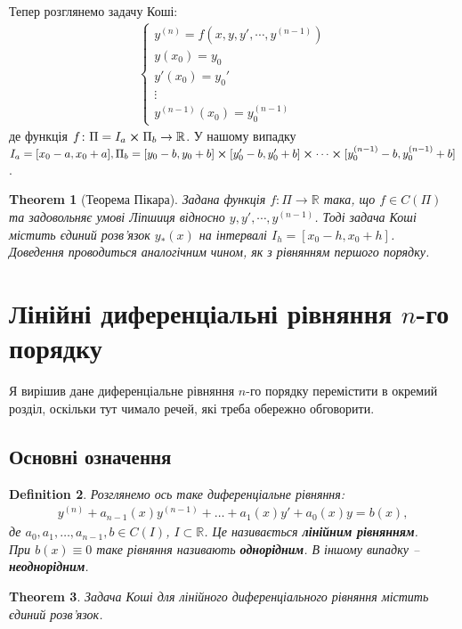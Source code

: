 \documentclass[a4paper, 10pt]{article}
\theoremstyle{theoremdd}
\newtheorem{theorem}{Theorem}[subsection]
\theoremstyle{theoremdd}
\newtheorem{definition}[theorem]{Definition}
\theoremstyle{theoremdd}
\theoremstyle{theoremdd}
\theoremstyle{theoremdd}
\theoremstyle{theoremdd}
\theoremstyle{theoremdd}
\theoremstyle{theoremdd}
\begin{document}
	Тепер розглянемо задачу Коші:
	\begin{align*}
	\begin{cases}
	\displaystyle y^{(n)} = f(x,y,y',\cdots,y^{(n-1)})\\
	y(x_0)=y_0\\
	y'(x_0) = y_0'\\
	\vdots \\
	y^{(n-1)}(x_0) = y_0^{(n-1)}
	\end{cases}
	\end{align*}
	де функція $f\colon \Pi = I_a \cross \Pi_b \to \mathbb{R}$. У нашому випадку $I_a = [x_0 - a, x_0 + a], \\ \Pi_b = [y_0 -b, y_0+b] \cross [y_0'-b,y_0'+b] \cross \cdots \cross [y_0^{(n-1)}-b, y_0^{(n-1)}+b]$.
	
	\begin{theorem}[Теорема Пікара]
	Задана функція $f\colon \Pi \to \mathbb{R}$ така, що $f \in C(\Pi)$ та задовольняє умові Ліпшиця відносно $y,y',\cdots,y^{(n-1)}$. Тоді задача Коші містить єдиний розв'язок $y_*(x)$ на інтервалі $I_h = [x_0-h, x_0+h]$.\\
	\textit{Доведення проводиться аналогічним чином, як з рівнянням першого порядку.}
	\end{theorem}
	\newpage
	
	\section{Лінійні диференціальні рівняння $n$-го порядку}
	Я вирішив дане диференціальне рівняння $n$-го порядку перемістити в окремий розділ, оскільки тут чимало речей, які треба обережно обговорити.
	\subsection{Основні означення}
	\begin{definition}
	Розглянемо ось таке диференціальне рівняння:
	\begin{align*}
	y^{(n)} + a_{n-1}(x)y^{(n-1)}+\dots+a_1(x)y'+a_0(x)y=b(x),
	\end{align*}
	де $a_0, a_1,\dots,a_{n-1},b \in C(I)$, $I \subset \mathbb{R}$. Це називається \textbf{лінійним рівнянням}.\\
	При $b(x) \equiv 0$ таке рівняння називають \textbf{однорідним}. В іншому випадку -- \textbf{неоднорідним}.
	\end{definition}
	
	\begin{theorem}
 Задача Коші для лінійного диференціального рівняння містить єдиний розв'язок.
 	\end{theorem}
 	
\end{document}
